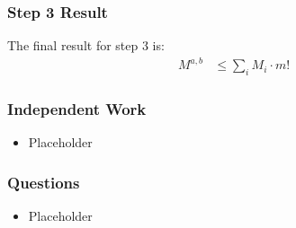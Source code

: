 \documentclass[aspectratio=169]{beamer}
\begin{document}
		\begin{frame}
			\frametitle{Step 3 Result}

			The final result for step 3 is:
			\begin{align*}
				M^{a,b} &\le \sum_i M_i \cdot m!
			\end{align*}
		\end{frame}

		\begin{frame}
			\frametitle{Independent Work}
			\begin{itemize}
				\item Placeholder 
			\end{itemize}
		\end{frame}

		\begin{frame}
			\frametitle{Questions}
			\begin{itemize}
				\item Placeholder
			\end{itemize}
		\end{frame}
\end{document}

